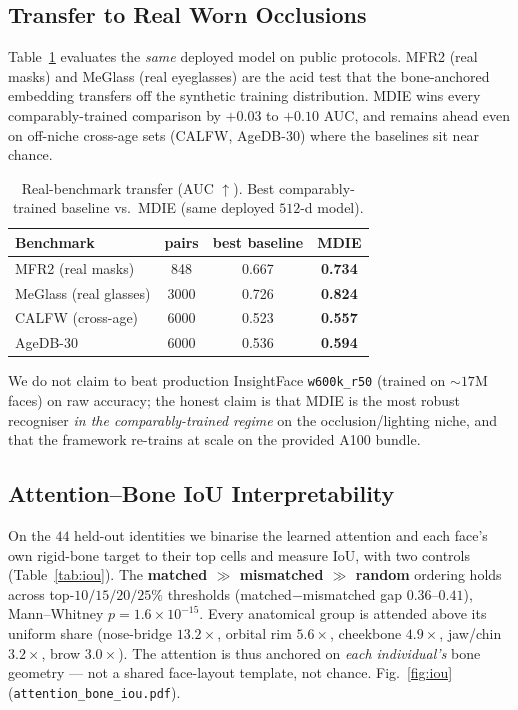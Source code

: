 \documentclass[10pt,conference]{IEEEtran}
\begin{document}
\subsection{Transfer to Real Worn Occlusions}
Table~\ref{tab:real} evaluates the \emph{same} deployed model on public
protocols. MFR2 (real masks) and MeGlass (real eyeglasses) are the acid test
that the bone-anchored embedding transfers off the synthetic training
distribution. MDIE wins every comparably-trained comparison by $+0.03$ to
$+0.10$ AUC, and remains ahead even on off-niche cross-age sets (CALFW,
AgeDB-30) where the baselines sit near chance.

\begin{table}[t]
\centering
\caption{Real-benchmark transfer (AUC $\uparrow$). Best comparably-trained
baseline vs.\ MDIE (same deployed $512$-d model).}
\label{tab:real}
\begin{tabular}{lccc}
\toprule
Benchmark & pairs & best baseline & \textbf{MDIE} \\
\midrule
MFR2 (real masks)    & 848   & 0.667 & \textbf{0.734} \\
MeGlass (real glasses)& 3000  & 0.726 & \textbf{0.824} \\
CALFW (cross-age)    & 6000  & 0.523 & \textbf{0.557} \\
AgeDB-30             & 6000  & 0.536 & \textbf{0.594} \\
\bottomrule
\end{tabular}
\end{table}

We do not claim to beat production InsightFace \texttt{w600k\_r50} (trained on
$\sim\!17$M faces) on raw accuracy; the honest claim is that MDIE is the most
robust recogniser \emph{in the comparably-trained regime} on the
occlusion/lighting niche, and that the framework re-trains at scale on the
provided A100 bundle.

\subsection{Attention--Bone IoU Interpretability}
\label{sec:interp}
On the $44$ held-out identities we binarise the learned attention and each
face's own rigid-bone target to their top cells and measure IoU, with two
controls (Table~\ref{tab:iou}). The \textbf{matched $\gg$ mismatched $\gg$
random} ordering holds across top-$10/15/20/25\%$ thresholds (matched$-$mismatched
gap $0.36$--$0.41$), Mann--Whitney $p\!=\!1.6\!\times\!10^{-15}$. Every
anatomical group is attended above its uniform share (nose-bridge $13.2\times$,
orbital rim $5.6\times$, cheekbone $4.9\times$, jaw/chin $3.2\times$, brow
$3.0\times$). The attention is thus anchored on \emph{each individual's} bone
geometry --- not a shared face-layout template, not chance.
Fig.~\ref{fig:iou} (\texttt{attention\_bone\_iou.pdf}).
\end{document}
